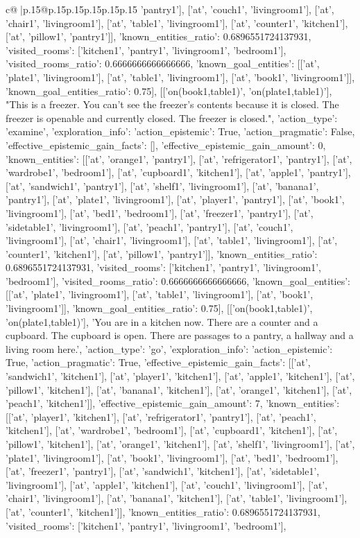 \documentclass{article}
\begin{document}
{\begin{supertabular}{c@{$\;$}|p{.15\linewidth}@{}p{.15\linewidth}p{.15\linewidth}p{.15\linewidth}p{.15\linewidth}p{.15\linewidth}}
{{{'pantry1'], ['at', 'couch1', 'livingroom1'], ['at', 'chair1', 'livingroom1'], ['at', 'table1', 'livingroom1'], ['at', 'counter1', 'kitchen1'], ['at', 'pillow1', 'pantry1']], 'known_entities_ratio': 0.6896551724137931, 'visited_rooms': ['kitchen1', 'pantry1', 'livingroom1', 'bedroom1'], 'visited_rooms_ratio': 0.6666666666666666, 'known_goal_entities': [['at', 'plate1', 'livingroom1'], ['at', 'table1', 'livingroom1'], ['at', 'book1', 'livingroom1']], 'known_goal_entities_ratio': 0.75}}], [['on(book1,table1)', 'on(plate1,table1)'], "This is a freezer. You can't see the freezer's contents because it is closed. The freezer is openable and currently closed. The freezer is closed.\n", {'action_type': 'examine', 'exploration_info': {'action_epistemic': True, 'action_pragmatic': False, 'effective_epistemic_gain_facts': [], 'effective_epistemic_gain_amount': 0, 'known_entities': [['at', 'orange1', 'pantry1'], ['at', 'refrigerator1', 'pantry1'], ['at', 'wardrobe1', 'bedroom1'], ['at', 'cupboard1', 'kitchen1'], ['at', 'apple1', 'pantry1'], ['at', 'sandwich1', 'pantry1'], ['at', 'shelf1', 'livingroom1'], ['at', 'banana1', 'pantry1'], ['at', 'plate1', 'livingroom1'], ['at', 'player1', 'pantry1'], ['at', 'book1', 'livingroom1'], ['at', 'bed1', 'bedroom1'], ['at', 'freezer1', 'pantry1'], ['at', 'sidetable1', 'livingroom1'], ['at', 'peach1', 'pantry1'], ['at', 'couch1', 'livingroom1'], ['at', 'chair1', 'livingroom1'], ['at', 'table1', 'livingroom1'], ['at', 'counter1', 'kitchen1'], ['at', 'pillow1', 'pantry1']], 'known_entities_ratio': 0.6896551724137931, 'visited_rooms': ['kitchen1', 'pantry1', 'livingroom1', 'bedroom1'], 'visited_rooms_ratio': 0.6666666666666666, 'known_goal_entities': [['at', 'plate1', 'livingroom1'], ['at', 'table1', 'livingroom1'], ['at', 'book1', 'livingroom1']], 'known_goal_entities_ratio': 0.75}}], [['on(book1,table1)', 'on(plate1,table1)'], 'You are in a kitchen now. There are a counter and a cupboard. The cupboard is open. There are passages to a pantry, a hallway and a living room here.\n', {'action_type': 'go', 'exploration_info': {'action_epistemic': True, 'action_pragmatic': True, 'effective_epistemic_gain_facts': [['at', 'sandwich1', 'kitchen1'], ['at', 'player1', 'kitchen1'], ['at', 'apple1', 'kitchen1'], ['at', 'pillow1', 'kitchen1'], ['at', 'banana1', 'kitchen1'], ['at', 'orange1', 'kitchen1'], ['at', 'peach1', 'kitchen1']], 'effective_epistemic_gain_amount': 7, 'known_entities': [['at', 'player1', 'kitchen1'], ['at', 'refrigerator1', 'pantry1'], ['at', 'peach1', 'kitchen1'], ['at', 'wardrobe1', 'bedroom1'], ['at', 'cupboard1', 'kitchen1'], ['at', 'pillow1', 'kitchen1'], ['at', 'orange1', 'kitchen1'], ['at', 'shelf1', 'livingroom1'], ['at', 'plate1', 'livingroom1'], ['at', 'book1', 'livingroom1'], ['at', 'bed1', 'bedroom1'], ['at', 'freezer1', 'pantry1'], ['at', 'sandwich1', 'kitchen1'], ['at', 'sidetable1', 'livingroom1'], ['at', 'apple1', 'kitchen1'], ['at', 'couch1', 'livingroom1'], ['at', 'chair1', 'livingroom1'], ['at', 'banana1', 'kitchen1'], ['at', 'table1', 'livingroom1'], ['at', 'counter1', 'kitchen1']], 'known_entities_ratio': 0.6896551724137931, 'visited_rooms': ['kitchen1', 'pantry1', 'livingroom1', 'bedroom1'], }}}
\end{supertabular}}
\end{document}
